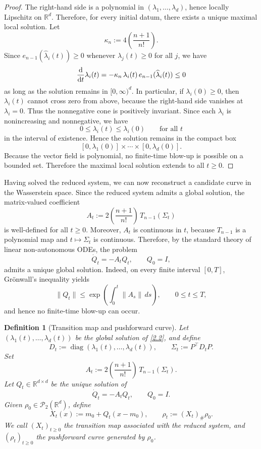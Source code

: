 \documentclass[11pt,reqno]{amsart}
\numberwithin{figure}{section}
\def\d {{\partial}}
\def\d{\mathrm{d}}
\renewcommand{\d}{  {\textup{d}} }
\newtheorem{definition}{Definition}[section]
\begin{document}
\begin{proof} 
The right-hand side is a polynomial in $(\lambda_1,\dots,\lambda_d)$, hence locally Lipschitz on $\mathbb R^d$. Therefore, for every initial datum, there exists a unique maximal local solution. Let \[ \kappa_n:=4\left(\frac{n+1}{n!}\right). \] 
Since $e_{n-1}(\widehat\lambda_i(t))\ge0$ whenever $\lambda_j(t)\ge0$ for all $j$, we have \[ \frac{\d}{\d t}\lambda_i(t)=-\kappa_n\,\lambda_i(t)\,e_{n-1}(\widehat\lambda_i(t))\le0 \] as long as the solution remains in $[0,\infty)^d$. In particular, if $\lambda_i(0)\ge0$, then $\lambda_i(t)$ cannot cross zero from above, because the right-hand side vanishes at $\lambda_i=0$. Thus the nonnegative cone is positively invariant. Since each $\lambda_i$ is nonincreasing and nonnegative, we have \[ 0\le \lambda_i(t)\le \lambda_i(0) \qquad\text{for all }t \] in the interval of existence. Hence the solution remains in the compact box \[ [0,\lambda_1(0)]\times\cdots\times[0,\lambda_d(0)]. \] Because the vector field is polynomial, no finite-time blow-up is possible on a bounded set. Therefore the maximal local solution extends to all $t\ge0$. \end{proof}




Having solved the reduced system, we can now reconstruct a candidate curve in the Wasserstein space. Since the reduced system admits a global solution, the matrix-valued coefficient
\[
A_t:=2\left(\frac{n+1}{n!}\right)\,T_{n-1}(\Sigma_t)
\]
is well-defined for all $t\ge0$. Moreover, $A_t$ is continuous in $t$, because $T_{n-1}$ is a polynomial map and $t\mapsto \Sigma_t$ is continuous. Therefore, by the standard theory of linear non-autonomous ODEs, the problem
\[
\dot Q_t=-A_tQ_t,\qquad Q_0=I,
\]
admits a unique global solution. Indeed, on every finite interval $[0,T]$, Gr\"onwall's inequality yields
\[
\|Q_t\|
\le
\exp\!\left(\int_0^t \|A_s\|\,ds\right),
\qquad 0\le t\le T,
\]
and hence no finite-time blow-up can occur.

\begin{definition}[Transition map and pushforward curve] \label{def:transition-pushforward} Let $(\lambda_1(t),\dots,\lambda_d(t))$ be the global solution of \eqref{2.2}, and define \[ D_t:=\operatorname{diag}(\lambda_1(t),\dots,\lambda_d(t)), \qquad \Sigma_t:=P^\top D_tP. \] Set \[ A_t:=2\left(\frac{n+1}{n!}\right)\,T_{n-1}(\Sigma_t). \] Let $Q_t\in\mathbb R^{d\times d}$ be the unique solution of \[ \dot Q_t=-A_tQ_t, \qquad Q_0=I. \] Given $\rho_0\in\mathcal P_2(\mathbb R^d)$, define \[ X_t(x):=m_0+Q_t(x-m_0), \qquad \rho_t:=(X_t)_\#\rho_0. \] We call $(X_t)_{t\ge0}$ the transition map associated with the reduced system, and $(\rho_t)_{t\ge0}$ the pushforward curve generated by $\rho_0$. \end{definition}
\end{document}
